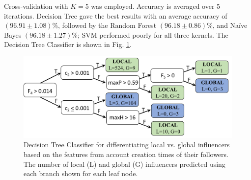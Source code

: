 Cross-validation with $K=5$ was employed. Accuracy is averaged over  5 iterations. Decision Tree gave the best results with an average accuracy of $(96.91\pm 1.08)$\%, followed by the Random Forest $(96.18 \pm 0.86)$\%, and Na\"ive Bayes $(96.18 \pm 1.27)$\%; SVM performed  poorly for all three kernels. The Decision Tree Classifier is shown in Fig. \ref{fig_decTree}.

\begin{figure}[!t]
\centering
\includegraphics[width=5.9in]{Figures/DecisionTree.png}
 \caption[Global vs. Local Classifier]{Decision Tree Classifier for differentiating local vs. global influencers based on the features from account creation times of their followers. The number of local (L) and global (G) influencers predicted using each branch shown for each leaf node.}
\label{fig_decTree}
\end{figure}

